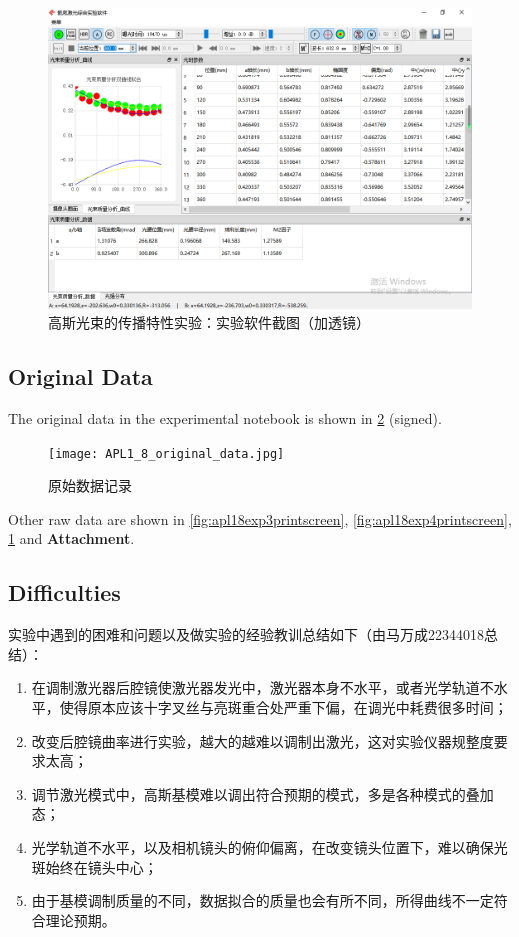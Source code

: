 \begin{enumerate}
	\begin{figure}[h!]
		\centering
		\includegraphics[width=0.7\linewidth]{images/APL1_8_exp4_printscreenT}
		\caption{高斯光束的传播特性实验：实验软件截图（加透镜）}
		\label{fig:apl18exp4printscreent}
	\end{figure}
	
\end{enumerate}

\subsection{Original Data}
The original data in the experimental notebook is shown in \cref{fig:d8-originaldata-1} (signed).

\begin{figure}[htbp]
	\centering
	\texttt{[image: APL1\_8\_original\_data.jpg]}
	\caption{原始数据记录}
	\label{fig:d8-originaldata-1}
\end{figure}


Other raw data are shown in \cref{fig:apl18exp3printscreen}, \cref{fig:apl18exp4printscreen}, \cref{fig:apl18exp4printscreent} and \textbf{Attachment}.


\subsection{Difficulties}
实验中遇到的困难和问题以及做实验的经验教训总结如下（由马万成22344018总结）：
\begin{enumerate}
	\item 在调制激光器后腔镜使激光器发光中，激光器本身不水平，或者光学轨道不水平，使得原本应该十字叉丝与亮斑重合处严重下偏，在调光中耗费很多时间；
	\item 改变后腔镜曲率进行实验，越大的越难以调制出激光，这对实验仪器规整度要求太高；
	\item 调节激光模式中，高斯基模难以调出符合预期的模式，多是各种模式的叠加态；
	\item 光学轨道不水平，以及相机镜头的俯仰偏离，在改变镜头位置下，难以确保光斑始终在镜头中心；
	\item 由于基模调制质量的不同，数据拟合的质量也会有所不同，所得曲线不一定符合理论预期。
\end{enumerate}
